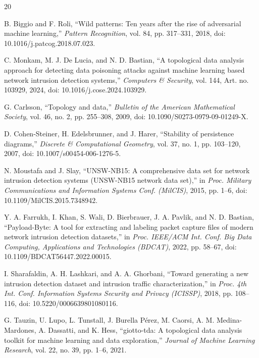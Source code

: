 \documentclass[conference]{IEEEtran}
\begin{document}
\balance
\FloatBarrier
\begin{thebibliography}{20}

B. Biggio and F. Roli, ``Wild patterns: Ten years after the rise of adversarial
machine learning,'' \emph{Pattern Recognition}, vol. 84, pp. 317--331, 2018,
doi: 10.1016/j.patcog.2018.07.023.

C. Monkam, M. J. De Lucia, and N. D. Bastian, ``A topological data analysis
approach for detecting data poisoning attacks against machine learning based
network intrusion detection systems,'' \emph{Computers \& Security}, vol. 144,
Art. no. 103929, 2024, doi: 10.1016/j.cose.2024.103929.

G. Carlsson, ``Topology and data,'' \emph{Bulletin of the American Mathematical
Society}, vol. 46, no. 2, pp. 255--308, 2009,
doi: 10.1090/S0273-0979-09-01249-X.

D. Cohen-Steiner, H. Edelsbrunner, and J. Harer, ``Stability of persistence
diagrams,'' \emph{Discrete \& Computational Geometry}, vol. 37, no. 1,
pp. 103--120, 2007, doi: 10.1007/s00454-006-1276-5.

N. Moustafa and J. Slay, ``UNSW-NB15: A comprehensive data set for network
intrusion detection systems (UNSW-NB15 network data set),'' in \emph{Proc.
Military Communications and Information Systems Conf. (MilCIS)}, 2015,
pp. 1--6, doi: 10.1109/MilCIS.2015.7348942.

Y. A. Farrukh, I. Khan, S. Wali, D. Bierbrauer, J. A. Pavlik, and
N. D. Bastian, ``Payload-Byte: A tool for extracting and labeling packet
capture files of modern network intrusion detection datasets,'' in
\emph{Proc. IEEE/ACM Int. Conf. Big Data Computing, Applications and
Technologies (BDCAT)}, 2022, pp. 58--67,
doi: 10.1109/BDCAT56447.2022.00015.

I. Sharafaldin, A. H. Lashkari, and A. A. Ghorbani, ``Toward generating a new
intrusion detection dataset and intrusion traffic characterization,'' in
\emph{Proc. 4th Int. Conf. Information Systems Security and Privacy (ICISSP)},
2018, pp. 108--116, doi: 10.5220/0006639801080116.

G. Tauzin, U. Lupo, L. Tunstall, J. Burella P\'erez, M. Caorsi,
A. M. Medina-Mardones, A. Dassatti, and K. Hess, ``giotto-tda: A topological
data analysis toolkit for machine learning and data exploration,''
\emph{Journal of Machine Learning Research}, vol. 22, no. 39, pp. 1--6, 2021.


\end{thebibliography}
\end{document}
